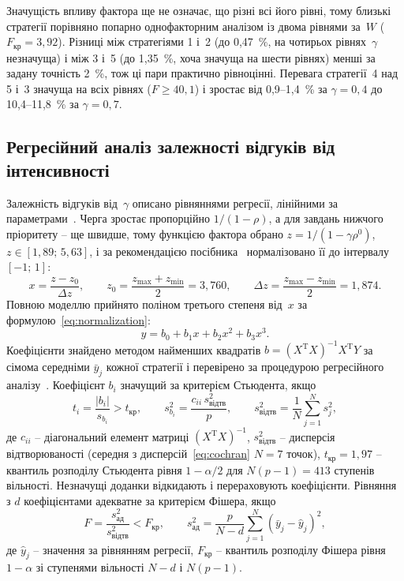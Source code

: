 Значущість впливу фактора ще не означає, що різні всі його рівні, тому близькі стратегії
порівняно попарно однофакторним аналізом із двома рівнями за~$W$
($F_{\text{кр}} = 3{,}92$). Різниці між стратегіями 1 і~2 (до 0,47~\%,
на чотирьох рівнях~$\gamma$ незначуща) і між 3 і~5 (до 1,35~\%, хоча значуща на шести рівнях)
менші за задану точність 2~\%, тож ці пари практично рівноцінні. Перевага стратегії~4 над 5 і~3 значуща на
всіх рівнях ($F \ge 40{,}1$) і зростає від 0,9--1,4~\% за $\gamma = 0{,}4$ до 10,4--11,8~\% за
$\gamma = 0{,}7$.

\subsection{Регресійний аналіз залежності відгуків від інтенсивності}\label{sec:exp-regression}

Залежність відгуків від~$\gamma$ описано рівняннями регресії, лінійними за
параметрами~\cite{stetsenko-kursova}. Черга зростає пропорційно $1/(1-\rho)$, а для завдань
нижчого пріоритету -- ще швидше, тому функцією фактора обрано
$z = 1/(1 - \gamma\rho^0)$, $z \in [1{,}89;\,5{,}63]$, і за рекомендацією
посібника~\cite{stetsenko-kursova} нормалізовано її до інтервалу $[-1;\,1]$:
\begin{equation}\label{eq:normalization}
  x = \frac{z - z_0}{\Delta z}, \qquad z_0 = \frac{z_{\max} + z_{\min}}{2} = 3{,}760, \qquad
  \Delta z = \frac{z_{\max} - z_{\min}}{2} = 1{,}874.
\end{equation}
Повною моделлю прийнято поліном третього степеня від~$x$ за формулою~\eqref{eq:normalization}:
\begin{equation}\label{eq:regression}
  y = b_0 + b_1 x + b_2 x^2 + b_3 x^3.
\end{equation}
Коефіцієнти знайдено методом найменших квадратів $b = (X^{\mathrm T}X)^{-1}X^{\mathrm T}Y$ за
сімома середніми $\bar y_j$ кожної стратегії і перевірено за процедурою регресійного
аналізу~\cite{stetsenko-modeling}. Коефіцієнт $b_i$ значущий за критерієм Стьюдента, якщо
\begin{equation}\label{eq:student}
  t_i = \frac{|b_i|}{s_{b_i}} > t_{\text{кр}}, \qquad
  s_{b_i}^2 = \frac{c_{ii}\,s^2_{\text{відтв}}}{p}, \qquad
  s^2_{\text{відтв}} = \frac{1}{N}\sum_{j=1}^{N} s_j^2,
\end{equation}
де $c_{ii}$ -- діагональний елемент матриці $(X^{\mathrm T}X)^{-1}$, $s^2_{\text{відтв}}$ --
дисперсія відтворюваності (середня з дисперсій~\eqref{eq:cochran} $N = 7$ точок), $t_{\text{кр}} =
1{,}97$ -- квантиль розподілу Стьюдента рівня $1 - \alpha/2$ для $N(p-1) = 413$ ступенів вільності.
Незначущі доданки відкидають і перераховують коефіцієнти. Рівняння з $d$ коефіцієнтами
адекватне за критерієм Фішера, якщо
\begin{equation}\label{eq:fisher}
  F = \frac{s^2_{\text{ад}}}{s^2_{\text{відтв}}} < F_{\text{кр}}, \qquad
  s^2_{\text{ад}} = \frac{p}{N-d}\sum_{j=1}^{N}\left(\bar y_j - \hat y_j\right)^2,
\end{equation}
де $\hat y_j$ -- значення за рівнянням регресії, $F_{\text{кр}}$ -- квантиль розподілу Фішера
рівня $1-\alpha$ зі ступенями вільності $N - d$ і $N(p-1)$.


